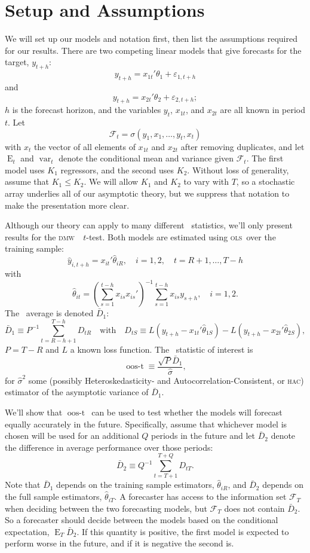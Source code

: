 \documentclass[11pt]{article}
\DeclareMathOperator{\E}{E}
\DeclareMathOperator{\var}{var}
\newcommand{\oost}{\ensuremath{\operatorname{oos-t}}}
\newcommand{\oosSum}[2]{\ensuremath{\sum_{#1=R-\h+#2}^{T-\h}}}
\newcommand{\h}{h}
\newcommand{\bh}[1]{\ensuremath{\hat\theta_{#1}}}
\newcommand{\dmw}{\textsc{dmw}}
\newcommand{\ols}{\textsc{ols}}
\newcommand{\hac}{\textsc{hac}}
\begin{document}
\section{Setup and Assumptions}\label{sec:assumptions}
We will set up our models and notation first, then list the assumptions
required for our results.  There are two competing linear models that
give forecasts for the target, $y_{t+\h}$:
\[
y_{t+\h} = x_{1t}'\theta_1 + \varepsilon_{1,t+h}
\]
and
\[
y_{t+\h} = x_{2t}'\theta_2 + \varepsilon_{2,t+h};
\]
$\h$ is the forecast horizon, and the variables $y_t$, $x_{1t}$, and
$x_{2t}$ are all known in period $t$.  Let
\begin{equation*}
  \mathcal{F}_t = \sigma(y_1, x_1, \dots, y_t, x_t)
\end{equation*}
with $x_t$ the vector of all elements of $x_{1t}$ and $x_{2t}$ after
removing duplicates, and let $\E_t$ and $\var_t$ denote the
conditional mean and variance given $\mathcal{F}_t$.  The first model
uses $K_1$ regressors, and the second uses $K_2$.  Without loss of
generality, assume that $K_1 \leq K_2$.  We will allow $K_1$ and $K_2$
to vary with $T$, so a stochastic array underlies all of our
asymptotic theory, but we suppress that notation to make the
presentation more clear.

Although our theory can apply to many different \oos\ statistics,
we'll only present results for the \dmw\ \oos\ $t$-test.  Both models
are estimated using \ols\ over the training sample:
\[
\hat y_{i,t+\h} = x_{it}'\bh{iR}, \quad i=1,2, \quad t = R+1,\dots,T-h
\]
with
\[
\bh{it} = (\sum_{s=1}^{t-\h} x_{is}x_{is}')^{-1} \sum_{s=1}^{t-\h} x_{is} y_{s+\h},
\quad i=1,2.
\]
The \oos\ average is denoted $\bar D_1$:
\[
\bar D_1 \equiv P^{-1} \oosSum{t}{1} D_{tR}
\quad \text{with} \quad D_{tS} \equiv L(y_{t+\h} - x_{1t}'\bh{1S}) -
L(y_{t+\h} - x_{2t}'\bh{2S}),
\]
$P = T - R$ and $L$ a known loss function.  The \oos\ statistic
of interest is 
\[
\oost \equiv \frac{\sqrt{P} \bar D_1}{\hat\sigma},
\]
for $\hat\sigma^2$ some (possibly Heteroskedasticity- and
Autocorrelation-Consistent, or \hac) estimator of the asymptotic
variance of $\bar D_1$.

We'll show that \oost\ can be used to test whether the models will
forecast equally accurately in the future.  Specifically, assume that
whichever model is chosen will be used for an additional $Q$ periods
in the future and let $\bar D_2$ denote the difference in average
performance over those periods:
\[
\bar D_2 \equiv Q^{-1} \sum_{t=T+1}^{T+Q} D_{tT}.
\]
Note that $\bar D_1$ depends on the training sample estimators,
$\hat\theta_{iR}$, and $\bar D_2$ depends on the full sample
estimators, $\hat\theta_{iT}$.  A forecaster has access to the
information set $\mathcal{F}_T$ when deciding between the two
forecasting models, but $\mathcal{F}_T$ does not contain $\bar D_2$.
So a forecaster should decide between the models based on the
conditional expectation, $\E_T \bar{D}_2$. If this quantity is
positive, the first model is expected to perform worse in the future,
and if it is negative the second is.
\end{document}
